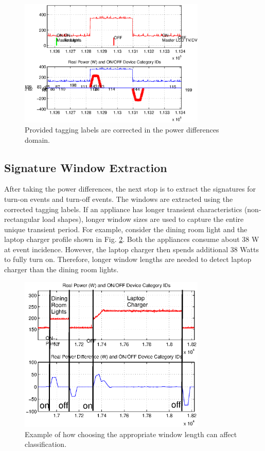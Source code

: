 \documentclass[conference]{IEEEtran}
\begin{document}
\begin{figure}[!t]
	\centering
	\includegraphics[width=3.5in]{fig/masterlights.eps}
	\caption{Provided tagging labels are corrected in the power differences domain.}
	\label{fig:tagging}
\end{figure}
	

\subsection{Signature Window Extraction}
After taking the power differences, the next stop is to extract the signatures for turn-on events and turn-off events. The windows are extracted using the corrected tagging labels.  If an appliance has longer transient characteristics (non-rectangular load shapes), longer window sizes are used to capture the entire unique transient period.  For example, consider the dining room light and the laptop charger profile shown in Fig. \ref{fig:windowlength}.  Both the appliances consume about 38 W at event incidence.  However, the laptop charger then spends additional 38 Watts to fully turn on.  Therefore, longer window lengths are needed to detect laptop charger than the dining room lights. 

\begin{figure}[!t]
	\centering
	\includegraphics[width=3.5in]{fig/windowlength.eps}
	\caption{Example of how choosing the appropriate window length can affect classification.}
	\label{fig:windowlength}
\end{figure}
\end{document}
